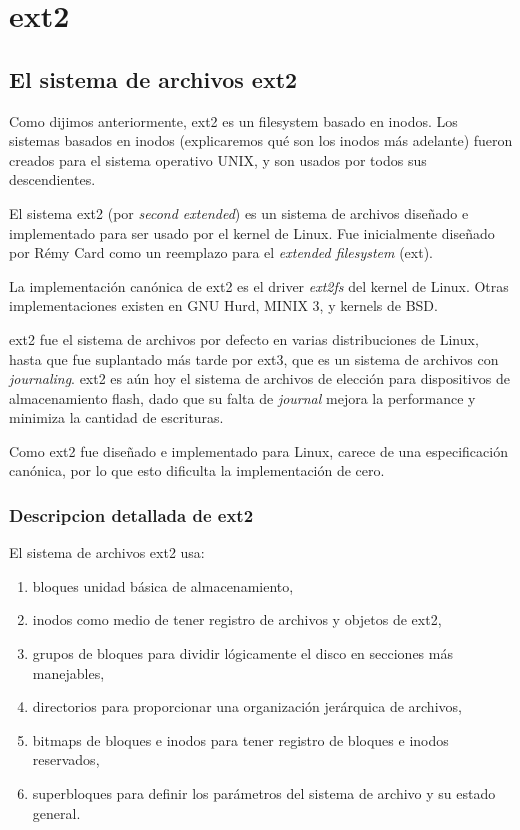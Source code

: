\chapter{ext2}

\section{El sistema de archivos ext2}

Como dijimos anteriormente, ext2 es un filesystem basado en inodos. Los sistemas basados en inodos (explicaremos qué son los inodos más adelante) fueron creados para el sistema operativo UNIX, y son usados por todos sus descendientes.

El sistema ext2 (por \emph{second extended}) es un sistema de archivos diseñado e implementado para ser usado por el kernel de Linux. Fue inicialmente diseñado por Rémy Card como un reemplazo para el \emph{extended filesystem} (ext).

La implementación canónica de ext2 es el driver \emph{ext2fs} del kernel de Linux. Otras implementaciones existen en GNU Hurd, MINIX 3, y kernels de BSD.

ext2 fue el sistema de archivos por defecto en varias distribuciones de Linux, hasta que fue suplantado más tarde por ext3, que es un sistema de archivos con \emph{journaling}.
ext2 es aún hoy el sistema de archivos de elección para dispositivos de almacenamiento flash, dado que su falta de \emph{journal} mejora la performance y minimiza la cantidad de escrituras. 


Como ext2 fue diseñado e implementado para Linux, carece de una especificación canónica, por lo que esto dificulta la implementación de cero.

\subsection{Descripcion detallada de ext2}

El sistema de archivos ext2 usa:
\begin{enumerate}
  \item bloques unidad básica de almacenamiento,
  \item inodos como medio de tener registro de archivos y objetos de ext2,
  \item  grupos de bloques para dividir lógicamente el disco en secciones más manejables,
  \item directorios para proporcionar una organización jerárquica de archivos,
  \item bitmaps de bloques e inodos para tener registro de bloques e inodos reservados,
  \item superbloques para definir los parámetros del sistema de archivo y su estado general.
\end{enumerate}

